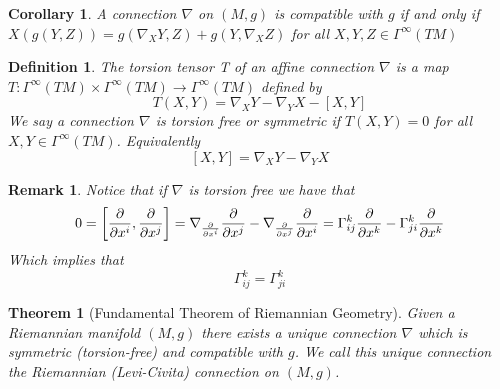 \documentclass[a4paper]{article}
\newtheorem*{defn}{Definition}
\newtheorem*{thm}{Theorem}
\newtheorem*{cor}{Corollary}
\newtheorem*{rem}{Remark}
\begin{document}
\begin{cor}
  A connection $\nabla$ on $(M,g)$ is compatible with $g$ if and only if $X(g(Y,Z)) = g(\nabla_X Y, Z) + g(Y, \nabla_X Z)$ for all $X,Y,Z \in \Gamma^{\infty}(TM)$
\end{cor}

\begin{defn}
  The torsion tensor T of an affine connection $\nabla$ is a map $T: \Gamma^{\infty}(TM) \times \Gamma^{\infty}(TM)  \rightarrow \Gamma^{\infty}(TM)$ defined by 
  \[
    T(X,Y) =  \nabla_X Y - \nabla_Y X - [X,Y]
  \]
  We say a connection $\nabla$ is torsion free or symmetric if $T(X,Y) = 0$ for all $X,Y \in \Gamma^{\infty}(TM)$. Equivalently 
  \[
    [X,Y] = \nabla_X Y - \nabla_Y X
  \]
\end{defn}

\begin{rem}
 Notice that if $\nabla$ is torsion free we have that
 \[
   0 = \left[ \pdv{x^i}, \pdv{x^j} \right] = \nabla_{\pdv{x^i}} \pdv{x^j} - \nabla_{\pdv{x^j}} \pdv{x^i} = \Gamma_{ij}^k \pdv{x^k} - \Gamma_{ji}^k \pdv{x^k}
 \]
 Which implies that
 \[
   \Gamma_{ij}^k = \Gamma_{ji}^k
 \]
\end{rem}

\begin{thm}[Fundamental Theorem of Riemannian Geometry]
  Given a Riemannian manifold $(M,g)$ there exists a unique connection $\nabla$ which is symmetric (torsion-free) and compatible with $g$. We call this unique connection the Riemannian (Levi-Civita) connection on $(M,g)$.
\end{thm}
\end{document}

